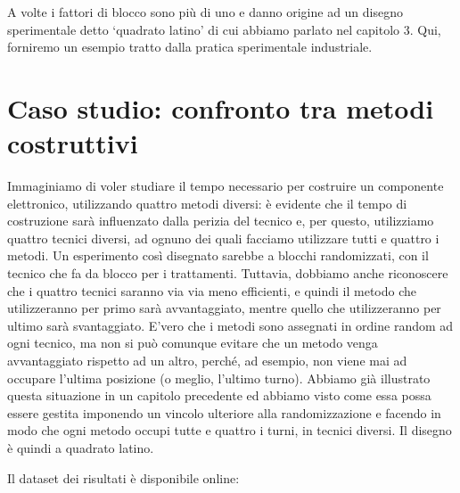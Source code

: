 \documentclass[a4paper,12pt,oneside]{book}
\begin{document}
A volte i fattori di blocco sono più di uno e danno origine ad un disegno sperimentale detto `quadrato latino' di cui abbiamo parlato nel capitolo 3. Qui, forniremo un esempio tratto dalla pratica sperimentale industriale.

\hypertarget{caso-studio-confronto-tra-metodi-costruttivi}{%
\section{Caso studio: confronto tra metodi costruttivi}\label{caso-studio-confronto-tra-metodi-costruttivi}}

Immaginiamo di voler studiare il tempo necessario per costruire un componente elettronico, utilizzando quattro metodi diversi: è evidente che il tempo di costruzione sarà influenzato dalla perizia del tecnico e, per questo, utilizziamo quattro tecnici diversi, ad ognuno dei quali facciamo utilizzare tutti e quattro i metodi. Un esperimento così disegnato sarebbe a blocchi randomizzati, con il tecnico che fa da blocco per i trattamenti. Tuttavia, dobbiamo anche riconoscere che i quattro tecnici saranno via via meno efficienti, e quindi il metodo che utilizzeranno per primo sarà avvantaggiato, mentre quello che utilizzeranno per ultimo sarà svantaggiato. E'vero che i metodi sono assegnati in ordine random ad ogni tecnico, ma non si può comunque evitare che un metodo venga avvantaggiato rispetto ad un altro, perché, ad esempio, non viene mai ad occupare l'ultima posizione (o meglio, l'ultimo turno). Abbiamo già illustrato questa situazione in un capitolo precedente ed abbiamo visto come essa possa essere gestita imponendo un vincolo ulteriore alla randomizzazione e facendo in modo che ogni metodo occupi tutte e quattro i turni, in tecnici diversi. Il disegno è quindi a quadrato latino.

Il dataset dei risultati è disponibile online:
\end{document}
